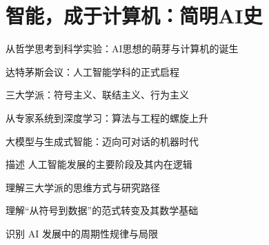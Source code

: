 \chapter{智能，成于计算机：简明AI史}



\begin{introduction}  
  \item 从哲学思考到科学实验：AI思想的萌芽与计算机的诞生
  \item 达特茅斯会议：人工智能学科的正式启程
  \item 三大学派：符号主义、联结主义、行为主义
  \item 从专家系统到深度学习：算法与工程的螺旋上升
  \item 大模型与生成式智能：迈向可对话的机器时代
\end{introduction}

\begin{introduction}
  \item 描述 人工智能发展的主要阶段及其内在逻辑
  \item 理解三大学派的思维方式与研究路径
  \item 理解“从符号到数据”的范式转变及其数学基础
  \item 识别 AI 发展中的周期性规律与局限
\end{introduction}


